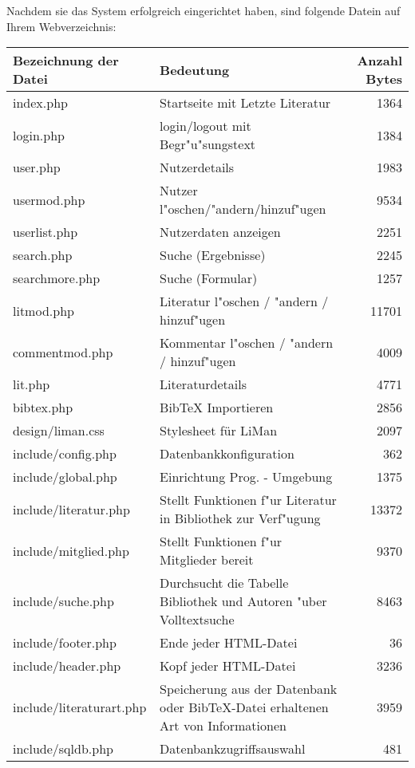 Nachdem sie das System erfolgreich eingerichtet haben, sind folgende Datein auf Ihrem Webverzeichnis:

\begin{longtable}{|l|p{6cm}|r|}
\hline
{\bf Bezeichnung der Datei} & {\bf Bedeutung} & {\bf Anzahl Bytes}\\
\hline\hline
\endhead

index.php & Startseite mit Letzte Literatur & 1364\\
\hline
login.php & login/logout mit Begr"u"sungstext & 1384\\
\hline
user.php & Nutzerdetails & 1983\\
\hline
usermod.php & Nutzer l"oschen/"andern/hinzuf"ugen & 9534\\
\hline
userlist.php & Nutzerdaten anzeigen & 2251\\
\hline
search.php & Suche (Ergebnisse) & 2245\\
\hline
searchmore.php & Suche (Formular) & 1257\\
\hline
litmod.php & Literatur l"oschen / "andern / hinzuf"ugen & 11701\\
\hline
commentmod.php & Kommentar l"oschen / "andern / hinzuf"ugen & 4009\\
\hline
lit.php & Literaturdetails & 4771\\
\hline
bibtex.php & BibTeX Importieren & 2856\\
\hline
design/liman.css & Stylesheet für LiMan & 2097\\
\hline
include/config.php & Datenbankkonfiguration & 362\\
\hline
include/global.php & Einrichtung Prog. - Umgebung & 1375\\
\hline
include/literatur.php & Stellt Funktionen f"ur Literatur in Bibliothek zur Verf"ugung & 13372\\
\hline
include/mitglied.php & Stellt Funktionen f"ur Mitglieder bereit & 9370\\
\hline
include/suche.php & Durchsucht die Tabelle Bibliothek und Autoren "uber Volltextsuche & 8463\\
\hline
include/footer.php & Ende jeder HTML-Datei & 36 \\
\hline
include/header.php & Kopf jeder HTML-Datei & 3236 \\
\hline
include/literaturart.php & Speicherung aus der Datenbank oder BibTeX-Datei erhaltenen Art von Informationen & 3959\\
\hline
include/sqldb.php & Datenbankzugriffsauswahl & 481 \\

\end{longtable}
